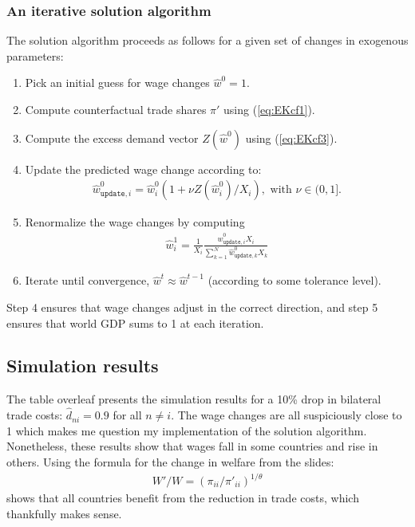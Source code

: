 \documentclass[12pt]{article}
\newcommand{\mtx}[1]{\ensuremath{\bm{\mathit{#1}}}}
\begin{document}
\subsubsection{An iterative solution algorithm}
The solution algorithm proceeds as follows for a given set of changes in exogenous parameters:
\begin{enumerate}
\item Pick an initial guess for wage changes $\hat{\mtx{w}}^0 = 1$.
\item Compute counterfactual trade shares $\mtx{\pi}'$ using (\ref{eq:EKcf1}).
\item Compute the excess demand vector $\mtx{Z}(\hat{\mtx{w}}^0)$ using  (\ref{eq:EKcf3}).
\item Update the predicted wage change according to:
\begin{align*}
\hat{w}^0_{\texttt{update},i} = \hat w^0_i(1+ \nu Z(\hat{{w}}_i^0)/X_i), \text{ with } \nu \in(0,1].
\end{align*}
\item Renormalize the wage changes by computing
\begin{align*}
\hat{{w}}_i^1 = \frac{1}{X_i}\frac{\hat{w}^0_{\texttt{update},i} X_i}{\sum_{k=1}^N \hat{w}^0_{\texttt{update},k} X_k}
\end{align*}
\item Iterate until convergence, $\hat{\mtx{w}}^t \approx \hat{\mtx{w}}^{t-1}$ (according to some tolerance level).
\end{enumerate}
Step 4 ensures that wage changes adjust in the correct direction, and step 5 ensures that world GDP sums to 1 at each iteration.


\subsection{Simulation results}
The table overleaf presents the simulation results for a 10\% drop in bilateral trade costs: $\hat d_{ni} = 0.9$ for all $n\neq i$. The wage changes are all suspiciously close to 1 which makes me question my implementation of the solution algorithm. Nonetheless, these results show that wages fall in some countries and rise in others. Using the formula for the change in welfare from the slides:
\begin{align*}
W'/W = (\pi_{ii}/\pi'_{ii})^{1/\theta}
\end{align*}
shows that all countries benefit from the reduction in trade costs, which thankfully makes sense.
\end{document}
